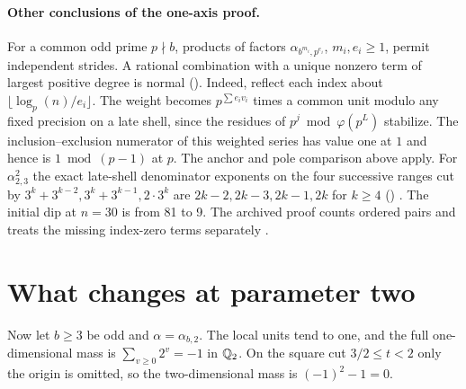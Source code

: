 \documentclass[11pt]{article}
\begin{document}
\paragraph{Other conclusions of the one-axis proof.}
For a common odd prime \(p\nmid b\), products of factors
\(\alpha_{b^{m_i},p^{e_i}}\), \(m_i,e_i\ge1\), permit independent strides.
A rational combination with a unique nonzero term of largest positive
degree is normal \cite[Theorem~2]{archive} 
(). Indeed, reflect each index
about \(\lfloor\log_p(n)/e_i\rfloor\). The weight becomes
\(p^{\sum e_i v_i}\) times a common unit modulo any fixed precision on a
late shell, since the residues of \(p^{j}\bmod\varphi(p^L)\) stabilize. The inclusion--exclusion
numerator of this weighted series has value one at \(1\) and hence is
\(1\bmod(p-1)\) at \(p\). The anchor and pole comparison above apply.
For \(\alpha_{2,3}^2\) the exact late-shell denominator exponents on the four
successive ranges cut by \(3^k+3^{k-2},3^k+3^{k-1},2\cdot3^k\) are
\(2k-2,2k-3,2k-1,2k\) for \(k\ge4\)
() . The initial dip at \(n=30\)
is from 81 to 9. The archived proof counts ordered pairs and treats the
missing index-zero terms separately \cite[Theorem~7]{archive}.

\section{What changes at parameter two}\label{two}
Now let \(b\ge3\) be odd and \(\alpha=\alpha_{b,2}\). The local units tend
to one, and the full one-dimensional mass is \(\sum_{v\ge0}2^v=-1\) in
\(\mathbb Q_2\). On the square cut \(3/2\le t<2\) only the origin is omitted,
so the two-dimensional mass is \((-1)^2-1=0\).
\end{document}
